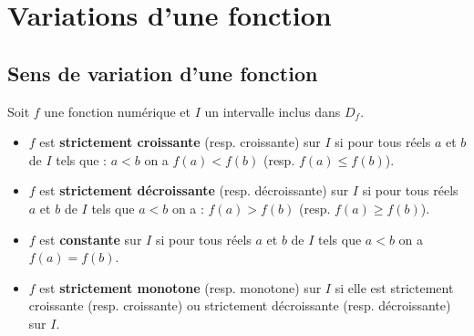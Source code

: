 \begin{center}
\end{center}











\section{Variations d'une fonction }

\subsection{Sens de variation d'une fonction }

\begin{Definition}[hi][]
Soit $f$ une fonction numérique et $I$ un intervalle inclus dans $D_f$.
\begin{itemize}
    \item $f$ est \textbf{strictement croissante} (resp. croissante) sur $I$ si pour tous réels $a$ et $b$ de $I$ tels que : $a < b$ on a $f(a) < f(b)$ (resp. $f(a) \leq f(b)$).
    \item $f$ est \textbf{strictement décroissante} (resp. décroissante) sur $I$ si pour tous réels $a$ et $b$ de $I$ tels que $a < b$ on a : $f(a) > f(b)$ (resp. $f(a) \geq f(b)$).
    \item $f$ est \textbf{constante} sur $I$ si pour tous réels $a$ et $b$ de $I$ tels que $a < b$ on a $f(a) = f(b)$.
    \item $f$ est \textbf{strictement monotone} (resp. monotone) sur $I$ si elle est strictement croissante (resp. croissante) ou strictement décroissante (resp. décroissante) sur $I$.
\end{itemize}
\end{Definition}

